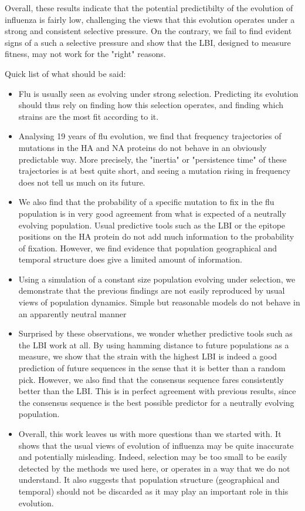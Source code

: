 \documentclass{article}
\begin{document}
Overall, these results indicate that the potential predictibilty of the evolution of influenza is fairly low, challenging the views that this evolution operates under a strong and consistent selective pressure. On the contrary, we fail to find evident signs of a such a selective pressure and show that the LBI, designed to measure fitness, may not work for the "right" reasons. 


Quick list of what should be said: 
\begin{itemize}
	\item Flu is usually seen as evolving under strong selection. Predicting its evolution should thus rely on finding how this selection operates, and finding which strains are the most fit according to it. 
	\item Analysing 19 years of flu evolution, we find that frequency trajectories of mutations in the HA and NA proteins do not behave in an obviously predictable way. More precisely, the "inertia" or "persistence time" of these trajectories is at best quite short, and seeing a mutation rising in frequency does not tell us much on its future. 
	\item We also find that the probability of a specific mutation to fix in the flu population is in very good agreement from what is expected of a neutrally evolving population. Usual predictive tools such as the LBI or the epitope positions on the HA protein do not add much information to the probability of fixation. However, we find evidence that population geographical and temporal structure does give a limited amount of information. 
	\item Using a simulation of a constant size population evolving under selection, we demonstrate that the previous findings are not easily reproduced by usual views of population dynamics. Simple but reasonable models do not behave in an apparently neutral manner
	\item Surprised by these observations, we wonder whether predictive tools such as the LBI work at all. By using hamming distance to future populations as a measure, we show that the strain with the highest LBI is indeed a good prediction of future sequences in the sense that it is better than a random pick. However, we also find that the consensus sequence fares consistently better than the LBI. This is in perfect agreement with previous results, since the consensus sequence is the best possible predictor for a neutrally evolving population. 
	\item Overall, this work leaves us with more questions than we started with. It shows that the usual views of evolution of influenza may be quite inaccurate and potentially misleading. Indeed, selection may be too small to be easily detected by the methods we used here, or operates in a way that we do not understand. It also suggests that population structure (geographical and temporal) should not be discarded as it may play an important role in this evolution. 
\end{itemize}
\end{document}
